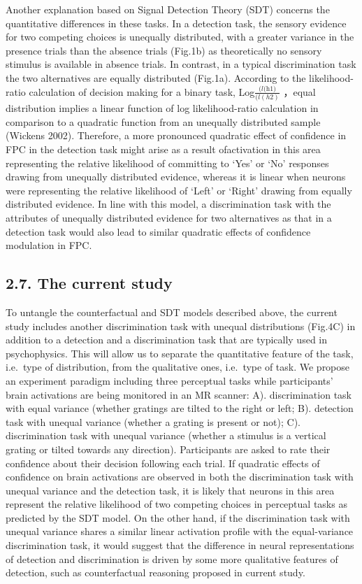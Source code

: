 \documentclass[]{article}
\begin{document}
Another explanation based on Signal Detection Theory (SDT) concerns the
quantitative differences in these tasks. In a detection task, the
sensory evidence for two competing choices is unequally distributed,
with a greater variance in the presence trials than the absence trials
(Fig.1b) as theoretically no sensory stimulus is available in absence
trials. In contrast, in a typical discrimination task the two
alternatives are equally distributed (Fig.1a). According to the
likelihood-ratio calculation of decision making for a binary task,
Log\(\frac{(\textit{l(h1)} }{(l(h2)}\) ，equal distribution implies a
linear function of log likelihood-ratio calculation in comparison to a
quadratic function from an unequally distributed sample (Wickens 2002).
Therefore, a more pronounced quadratic effect of confidence in FPC in
the detection task might arise as a result ofactivation in this area
representing the relative likelihood of committing to `Yes' or `No'
responses drawing from unequally distributed evidence, whereas it is
linear when neurons were representing the relative likelihood of `Left'
or `Right' drawing from equally distributed evidence. In line with this
model, a discrimination task with the attributes of unequally
distributed evidence for two alternatives as that in a detection task
would also lead to similar quadratic effects of confidence modulation in
FPC.

\hypertarget{the-current-study}{%
\subsection{2.7. The current study}\label{the-current-study}}

To untangle the counterfactual and SDT models described above, the
current study includes another discrimination task with unequal
distributions (Fig.4C) in addition to a detection and a discrimination
task that are typically used in psychophysics. This will allow us to
separate the quantitative feature of the task, i.e.~type of
distribution, from the qualitative ones, i.e.~type of task. We propose
an experiment paradigm including three perceptual tasks while
participants' brain activations are being monitored in an MR scanner:
A). discrimination task with equal variance (whether gratings are tilted
to the right or left; B). detection task with unequal variance (whether
a grating is present or not); C). discrimination task with unequal
variance (whether a stimulus is a vertical grating or tilted towards any
direction). Participants are asked to rate their confidence about their
decision following each trial. If quadratic effects of confidence on
brain activations are observed in both the discrimination task with
unequal variance and the detection task, it is likely that neurons in
this area represent the relative likelihood of two competing choices in
perceptual tasks as predicted by the SDT model. On the other hand, if
the discrimination task with unequal variance shares a similar linear
activation profile with the equal-variance discrimination task, it would
suggest that the difference in neural representations of detection and
discrimination is driven by some more qualitative features of detection,
such as counterfactual reasoning proposed in current study.
\end{document}
